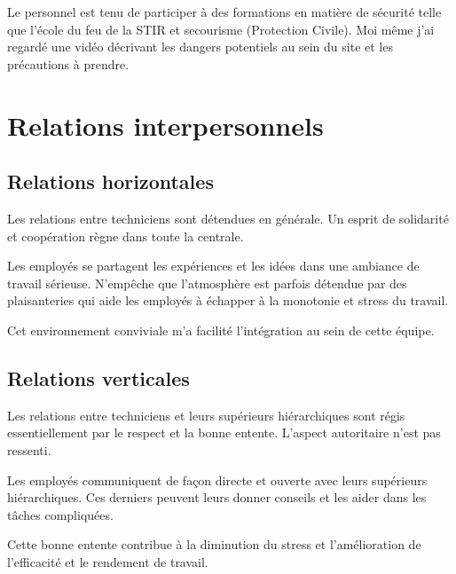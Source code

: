 Le personnel est tenu de participer  à des formations en matière de sécurité telle que l'école du feu de la STIR et secourisme (Protection Civile). Moi même j'ai regardé une vidéo décrivant les dangers potentiels au sein du site et les précautions à prendre.


\section{Relations interpersonnels}
\subsection{Relations horizontales}
Les relations entre techniciens sont détendues en générale. Un esprit de solidarité et coopération règne dans toute la centrale. 
 
Les employés se partagent les expériences et les idées dans une ambiance de travail sérieuse. N'empêche que l'atmosphère est parfois détendue par des plaisanteries qui aide les employés   à échapper à la monotonie et stress du travail.

Cet environnement conviviale m'a facilité l'intégration au sein de cette équipe. 

\subsection{Relations verticales}
Les relations entre techniciens et leurs supérieurs hiérarchiques sont régis essentiellement  par  le respect et la bonne entente. L'aspect autoritaire n'est pas ressenti.

 Les employés communiquent de façon directe et ouverte avec leurs supérieurs hiérarchiques. Ces derniers peuvent leurs donner conseils et les aider dans les tâches compliquées. 
 
Cette bonne entente contribue à la diminution du stress et l'amélioration de l'efficacité et le rendement de travail.  
 
 